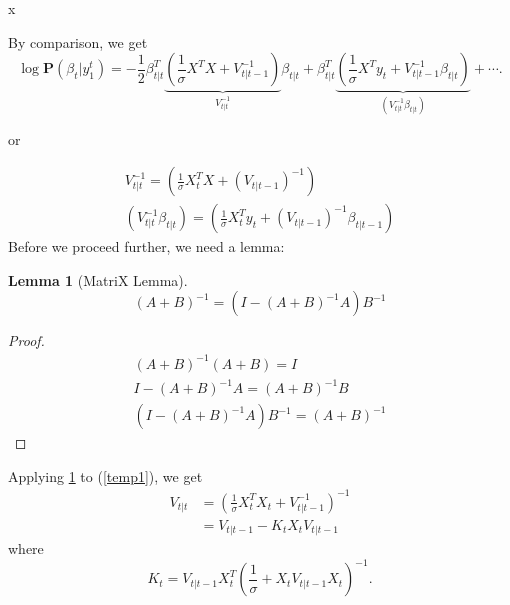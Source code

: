 \message{ !name(kalman_filter.tex)}x\documentclass{article}
\numberwithin{algorithm}{section}
\theoremstyle{plain}
\newtheorem{lem}[thm]{Lemma}
\theoremstyle{definition}
\theoremstyle{remark}
\newcommand{\PP}{\mathbf{P}}
\begin{document}
By comparison, we get
\begin{equation}
\log \PP(\beta_t |  y^t_1) = - \frac12\beta^T_{t|t} \underbrace{ (\frac1\sigma X^T X + V_{t|t-1}^{-1})}_{V_{t|t}^{-1}} \beta_{t|t} + \beta^T_{t|t} \underbrace{( \frac1\sigma X^T y_t + V_{t|t-1}^{-1} \beta_{t|t})}_{ (V_{t|t} ^{-1} \beta_{t|t})} + \cdots.
\end{equation}

or

\begin{eqnarray}
 V_{t|t} ^{-1}  =  (\frac1\sigma X_t^T X + (V_{t|t-1})^{-1}) \label{temp1}\\
 (V_{t|t} ^{-1} \beta_{t|t}) = ( \frac1\sigma X_t^T y_t + (V_{t|t-1})^{-1} \beta_{t|t-1})
\end{eqnarray}
Before we proceed further, we need a lemma:
\begin{lem}[MatriX Lemma]
\begin{equation}
(A+B)^{-1} = (I - (A+B)^{-1} A)B^{-1}
\end{equation}
\label{ml}
\end{lem}
\begin{proof}
\begin{eqnarray*}
(A+B)^{-1}(A+B) = I\\
I - (A+B)^{-1} A = (A+B)^{-1} B\\
(I- (A+B)^{-1} A) B^{-1} = (A+B)^{-1}
\end{eqnarray*}
\end{proof}

Applying \ref{ml} to (\ref{temp1}), we get
\begin{equation}
\begin{split}
V_{t|t} &= ( \frac1\sigma X_t^T X_t + V_{t|t-1}^{-1})^{-1}\\
&=  V_{t|t-1} - K_t X_t V_{t|t-1}
\end{split}
\end{equation}
where
\[
K_t = V_{t|t-1} X_t^T (\frac1\sigma + X_t V_{t|t-1} X_t )^{-1}.
\]
\end{document}
